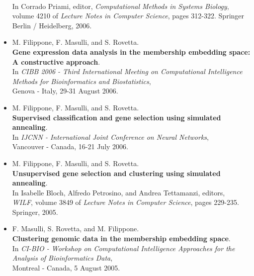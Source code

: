 \documentclass[a4paper,10pt]{article}
\begin{document}
\begin{itemize}
       \\In Corrado Priami, editor, \emph{Computational Methods in Systems Biology}, 
       \\volume 4210 of \emph{Lecture Notes in Computer Science}, pages 312-322. Springer Berlin / Heidelberg, 2006.
     \item  M. Filippone, F. Masulli, and S. Rovetta.
       \\\textbf{Gene expression data analysis in the membership embedding space: A constructive approach}.
       \\In \emph{CIBB 2006 - Third International Meeting on Computational 
       Intelligence Methods for Bioinformatics and Biostatistics}, 
       \\Genova - Italy, 29-31 August 2006.
     \item  M. Filippone, F. Masulli, and S. Rovetta.
       \\\textbf{Supervised classification and gene selection using simulated annealing}.
       \\In \emph{IJCNN - International Joint Conference on Neural Networks},
       \\Vancouver - Canada, 16-21 July 2006.
     \item  M. Filippone, F. Masulli, and S. Rovetta.
       \\\textbf{Unsupervised gene selection and clustering using simulated annealing}.
       \\In Isabelle Bloch, Alfredo Petrosino, and Andrea Tettamanzi, editors,
       \\\emph{WILF}, volume 3849 of \emph{Lecture Notes in Computer Science}, pages 229-235. Springer, 2005.
     \item  F. Masulli, S. Rovetta, and M. Filippone.
       \\\textbf{Clustering genomic data in the membership embedding space}.
       \\In \emph{CI-BIO - Workshop on Computational Intelligence Approaches for the Analysis of Bioinformatics Data},
       \\Montreal - Canada, 5 August 2005.

\end{itemize}
\end{document}
